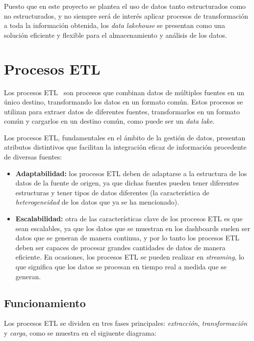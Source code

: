 Puesto que en este proyecto se plantea el uso de datos tanto estructurados como no estructurados,
y no siempre será de interés aplicar procesos de transformación a toda la información obtenida,
los \textit{data lakehouse} se presentan como una solución eficiente y flexible para el almacenamiento
y análisis de los datos.

\newpage{}
\section{Procesos ETL}\label{sec:etl}
Los procesos ETL~\cite{mier2023dashboards} son procesos que combinan datos de múltiples
fuentes en un único destino, transformando los datos en un formato común. Estos procesos
se utilizan para extraer datos de diferentes fuentes, transformarlos en un formato común
y cargarlos en un destino común, como puede ser un \textit{data lake}.

Los procesos ETL, fundamentales en el ámbito de la gestión de datos, presentan atributos
distintivos que facilitan la integración eficaz de información procedente de diversas fuentes:

\begin{itemize}
	\item \textbf{Adaptabilidad:} los procesos ETL deben de adaptarse a la estructura de los
		datos de la fuente de origen, ya que dichas fuentes pueden tener diferentes estructuras
		y tener tipos de datos diferentes (la característica de \textit{heterogeneidad} de los
		datos que ya se ha mencionado).
	\item \textbf{Escalabilidad:} otra de las características clave de los procesos ETL es que sean
		escalables, ya que los datos que se muestran en los dashboards suelen ser datos que se generan
		de manera continua, y por lo tanto los procesos ETL deben ser capaces de procesar grandes
		cantidades de datos de manera eficiente. En ocasiones, los procesos ETL se pueden realizar en
		\textit{streaming}, lo que significa que los datos se procesan en tiempo real a medida que se
		generan.
\end{itemize}

\newpage{}
\subsection{Funcionamiento}
Los procesos ETL se dividen en tres fases principales: \textit{extracción}, \textit{transformación}
y \textit{carga}, como se muestra en el sigiuente diagrama:

